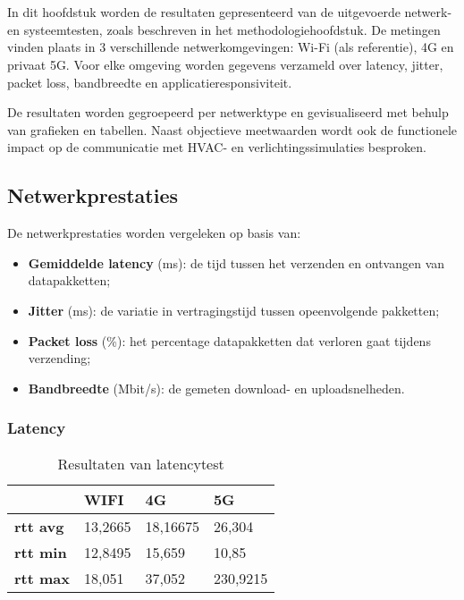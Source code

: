 \chapter{}%
\label{ch:resultaten}


In dit hoofdstuk worden de resultaten gepresenteerd van de uitgevoerde netwerk- en systeemtesten, zoals beschreven in het methodologiehoofdstuk. De metingen vinden plaats in 3 verschillende netwerkomgevingen: Wi-Fi (als referentie), 4G en privaat 5G. Voor elke omgeving worden gegevens verzameld over latency, jitter, packet loss, bandbreedte en applicatieresponsiviteit.

De resultaten worden gegroepeerd per netwerktype en gevisualiseerd met behulp van grafieken en tabellen. Naast objectieve meetwaarden wordt ook de functionele impact op de communicatie met HVAC- en verlichtingssimulaties besproken.

\section{Netwerkprestaties}

De netwerkprestaties worden vergeleken op basis van:

\begin{itemize}
    \item \textbf{Gemiddelde latency} (ms): de tijd tussen het verzenden en ontvangen van datapakketten;
    \item \textbf{Jitter} (ms): de variatie in vertragingstijd tussen opeenvolgende pakketten;
    \item \textbf{Packet loss} (\%): het percentage datapakketten dat verloren gaat tijdens verzending;
    \item \textbf{Bandbreedte} (Mbit/s): de gemeten download- en uploadsnelheden.
\end{itemize}

\subsection{Latency}
\begin{table}[]
    \begin{tabular}{l|l|l|l|}
        \cline{2-4}
        & \textbf{WIFI} & \textbf{4G} & \textbf{5G} \\ \hline
        \multicolumn{1}{|l|}{\textbf{rtt avg}} & 13,2665       & 18,16675    & 26,304      \\ \hline
        \multicolumn{1}{|l|}{\textbf{rtt min}} & 12,8495       & 15,659      & 10,85       \\ \hline
        \multicolumn{1}{|l|}{\textbf{rtt max}} & 18,051        & 37,052      & 230,9215    \\ \hline
    \end{tabular}
    \caption{Resultaten van latencytest}
\end{table}

